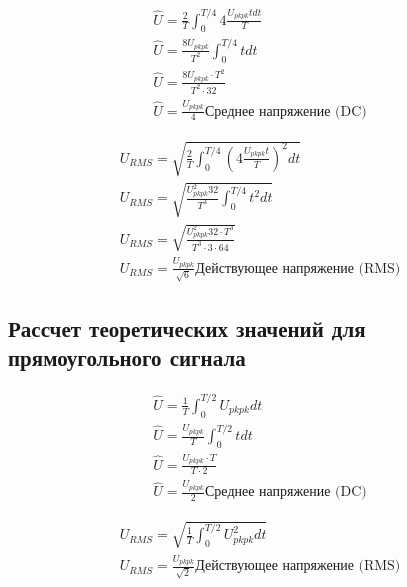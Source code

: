 \documentclass[a4paper,14pt]{article}
\begin{document}
\begin{equation}
\begin{aligned}
\hat{U}  = \frac{2}{T}\int_{0}^{T/4}{4\frac{U_{pkpk} t dt }{T}}\\
\hat{U}  = \frac{8U_{pkpk}}{T^2}\int_{0}^{T/4}{ t dt}\\
\hat{U}  = \frac{8U_{pkpk} \cdot T^2 }{T^2 \cdot 32}\\
\hat{U} = \frac{U_{pkpk}}{4} \text{Среднее напряжение (DC)}
\label{exp}
 \end{aligned}
\end{equation}


\begin{equation}
\begin{aligned}
U_{RMS}  =  \sqrt{\frac{2}{T}\int_{0}^{T/4}{(4\frac{U_{pkpk} t  }{T})^2} dt}\\
U_{RMS}  =  \sqrt{\frac{U_{pkpk}^2 32}{T^3}\int_{0}^{T/4}{t^2}dt}\\
U_{RMS}  =  \sqrt{\frac{U_{pkpk}^2 32 \cdot T^3}{T^3 \cdot 3 \cdot 64}}\\
U_{RMS}  =  \frac{U_{pkpk}}{\sqrt{6}} \text{Действующее напряжение (RMS)}
 \label{exp}
 \end{aligned}
\end{equation}



\subsection{Рассчет теоретических значений для прямоугольного сигнала}

\begin{equation}
\begin{aligned}
\hat{U}  = \frac{1}{T}\int_{0}^{T/2}{U_{pkpk} dt }\\
\hat{U}  = \frac{U_{pkpk}}{T}\int_{0}^{T/2}{ t dt}\\
\hat{U}  = \frac{U_{pkpk}\cdot T}{T\cdot 2}\\
\hat{U} = \frac{U_{pkpk}}{2} \text{Среднее напряжение (DC)}
\label{exp}
 \end{aligned}
\end{equation}


\begin{equation}
\begin{aligned}
U_{RMS}  =  \sqrt{ \frac{1}{T}\int_{0}^{T/2}{U_{pkpk}^2 dt }}\\
U_{RMS}  =  \frac{U_{pkpk}}{\sqrt{2}} \text{Действующее напряжение (RMS)}
 \label{exp}
 \end{aligned}
\end{equation}
\end{document}
